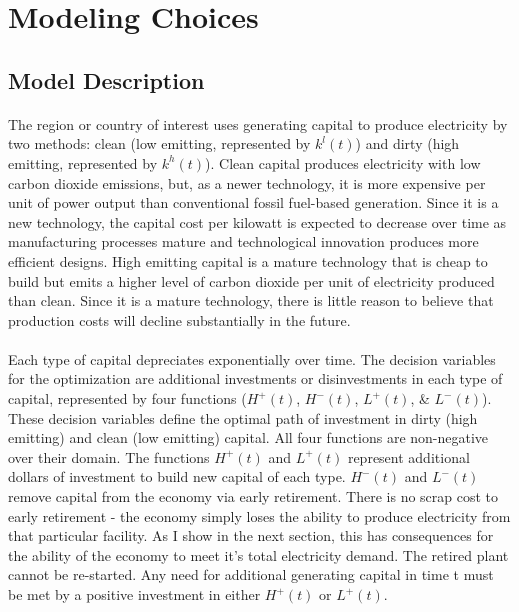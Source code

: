 \documentclass{article}
\begin{document}

\section{Modeling Choices}
\subsection{Model Description}\label{sec:ModelDesc}

\paragraph{} The region or country of interest uses generating capital to produce electricity by two methods: clean (low emitting, represented by $k^l(t)$) and dirty (high emitting, represented by $k^h(t)$). Clean capital produces electricity with low carbon dioxide emissions, but, as a newer technology, it is more expensive per unit of power output than conventional fossil fuel-based generation. Since it is a new technology, the capital cost per kilowatt is expected to decrease over time as manufacturing processes mature and technological innovation produces more efficient designs. High emitting capital is a mature technology that is cheap to build but emits a higher level of carbon dioxide per unit of electricity produced than clean. Since it is a mature technology, there is little reason to believe that production costs will decline substantially in the future. 


\paragraph{} Each type of capital depreciates exponentially over time. The decision variables for the optimization are additional investments or disinvestments in each type of capital, represented by four functions ($H^+(t)$, $H^-(t)$, $L^+(t)$, \& $L^-(t)$). These decision variables define the optimal path of investment in dirty (high emitting) and clean (low emitting) capital. All four functions are non-negative over their domain. The functions $H^+(t)$ and $L^+(t)$ represent additional dollars of investment to build new capital of each type. $H^-(t)$ and $L^-(t)$ remove capital from the economy via early retirement. There is no scrap cost to early retirement - the economy simply loses the ability to produce electricity from that particular facility. As I show in the next section, this has consequences for the ability of the economy to meet it's total electricity demand. The retired plant cannot be re-started. Any need for additional generating capital in time t must be met by a positive investment in either $H^+(t)$ or $L^+(t)$. 
\end{document}
